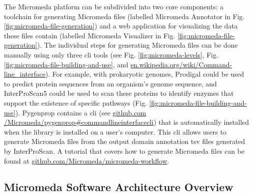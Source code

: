 The Micromeda platform can be subdivided into two core components: a 
toolchain for generating Micromeda files (labelled Micromeda Annotator in Fig. 
\ref{fig:micromeda-file-generation}) and a web application for visualizing the 
data these files contain (labelled Micromeda Visualizer in Fig. 
\ref{fig:micromeda-file-generation}). The individual steps for generating 
Micromeda files can be done manually using only three \gls{cli} tools (see Fig. 
\ref{fig:micromeda-levels}, Fig. \ref{fig:micromeda-file-building-and-use}, and  
\href{http://en.wikipedia.org/wiki/Command-line_interface}{en.wikipedia.org/wiki/Command-line\_interface}). 
For example, with prokaryotic genomes, Prodigal could be used to predict protein 
sequences from an organism's genome sequence, and InterProScan5 could be used to 
scan these proteins to identify enzymes that support the existence of specific 
pathways (Fig. \ref{fig:micromeda-file-building-and-use}). Pygenprop contains a 
\gls{cli} (see 
\href{https://github.com/Micromeda/pygenprop#command-line-interface-cli}{github.com /Micromeda/pygenprop\#command\-line\-interface\-cli}) 
that is automatically installed when the library is installed on a user’s 
computer. This \gls{cli} allows users to generate Micromeda files from the 
output domain annotation \gls{tsv} files generated by InterProScan. A tutorial 
that covers how to generate Micromeda files can be found at 
\href{https://github.com/Micromeda/micromeda-workflow}{github.com/Micromeda/micromeda-workflow}.

\subsection{Micromeda Software Architecture Overview} \label{why-micromeda-files}

